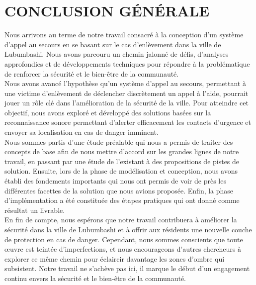 \chapter*{CONCLUSION GÉNÉRALE}
\justifying
\large
\setlength{\parindent}{2.5em}
Nous arrivons au terme de notre travail consacré à la conception d'un système d’appel au secours en se basant sur le cas d'enlèvement dans la ville de Lubumbashi. Nous avons parcouru un chemin jalonné de défis, d'analyses approfondies et de développements techniques pour répondre à la problématique de renforcer la sécurité et le bien-être de la communauté.\\

Nous avons avancé l'hypothèse qu'un système d'appel au secours, permettant à une victime d'enlèvement de déclencher discrètement un appel à l'aide, pourrait jouer un rôle clé dans l'amélioration de la sécurité de la ville. Pour atteindre cet objectif, nous avons exploré et développé des solutions basées sur la reconnaissance sonore permettant d'alerter efficacement les contacts d'urgence et envoyer sa localisation en cas de danger imminent.\\

Nous sommes partis d’une étude préalable qui nous a permis de traiter des concepts de base afin de nous mettre d'accord sur les grandes lignes de notre travail, en passant par une étude de l’existant à des propositions de pistes de solution. Ensuite, lors de la phase de modélisation et conception, nous avons établi des fondements importants qui nous ont permis de voir de près les différentes facettes de la solution que nous avions proposée. Enfin, la phase d’implémentation a été constituée des étapes pratiques qui ont donné comme résultat un livrable.\\

En fin de compte, nous espérons que notre travail contribuera à améliorer la sécurité dans la ville de Lubumbashi et à offrir aux résidents une nouvelle couche de protection en cas de danger. Cependant, nous sommes conscients que toute œuvre est teintée d'imperfections, et nous encourageons d'autres chercheurs à explorer ce même chemin pour éclaircir davantage les zones d'ombre qui subsistent.
Notre travail ne s'achève pas ici, il marque le début d'un engagement continu envers la sécurité et le bien-être de la communauté.
